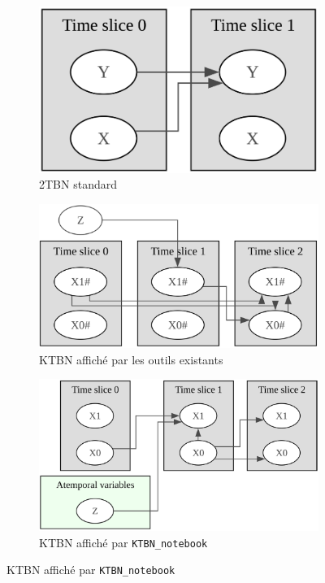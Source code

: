 \documentclass{article}
\begin{document}
\begin{figure}[t]
    \centering
    \begin{subfigure}[t]{0.45\textwidth}
        \centering
        \includegraphics[width=\linewidth]{img/2TBN.png}
        \caption{2TBN standard}
        \label{fig:KTBN_notebook:a}
    \end{subfigure}
    \hfill
    \begin{subfigure}[t]{0.45\textwidth}
        \centering
        \includegraphics[width=\linewidth]{img/KTBN_gum.png}
        \caption{KTBN affiché par les outils existants}
        \label{fig:KTBN_notebook:b}
    \end{subfigure}

    \vspace{1em}

    \begin{subfigure}[t]{0.6\textwidth}
        \centering
        \includegraphics[width=\linewidth]{img/KTBN.png}
        \caption{KTBN affiché par \texttt{KTBN\_notebook}}
        \label{fig:KTBN_notebook:c}
    \end{subfigure}


\end{figure}
\end{document}
